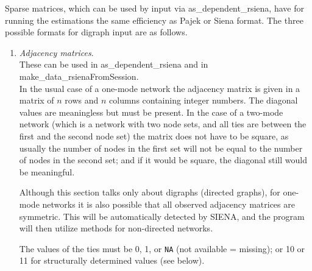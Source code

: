 \documentclass[a4paper,fleqn,11pt]{article}
\newcommand{\+}{\, + \,}
\newcommand{\sfn}[1]{\textsf{#1}}
\newcommand{\si}{{\sf SIENA}}
\newcommand{\sn}{{\sf StOCNET}}
\begin{document}
Sparse matrices, which can be used by input via
\sfn{as\_dependent\_rsiena}, have for running the estimations
the same efficiency as Pajek or Siena format.
The three possible formats for digraph input are as follows.
\begin{enumerate}
\item \emph{Adjacency matrices}.\\
      These can be used in  \textsf{as\_dependent\_rsiena} and in
      \sfn{make\_data\_rsienaFromSession}.\\
      In the usual case of a one-mode network the adjacency matrix
      is given in a matrix of $n$ rows and $n$ columns
      containing integer numbers.
      The diagonal values are meaningless but must be present.
      In the case of a two-mode network (which is a network with two
      node sets, and all ties are between the first and the second node set)
      the matrix does not have to be
      square, as usually the number of nodes in the first set will not be
      equal to the number of nodes in the second set;
      and if it would be square, the diagonal still would be meaningful.

      Although this section talks only about digraphs (directed graphs),
      for one-mode networks it is
      also possible that all observed adjacency matrices are symmetric.
      This will be automatically detected by \si, and
      the program will then utilize methods for non-directed networks.

      The values of the ties must be 0, 1, or \texttt{NA}
      (not available = missing);
      or 10 or 11 for structurally determined values (see below).


\end{enumerate}
\end{document}
